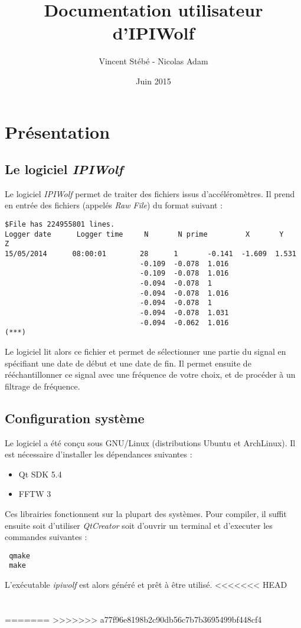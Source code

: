 \documentclass[a4paper,12pt]{article}
\begin{document}
\title{Documentation utilisateur d'IPIWolf}
\author{Vincent Stébé - Nicolas Adam}
\date{Juin 2015}

\maketitle

\newpage 
{}

\tableofcontents
\vspace{1cm}
\restoregeometry
\newpage

\section{Présentation}
\subsection{Le logiciel \emph{IPIWolf}}
Le logiciel \emph{IPIWolf} permet de traiter des fichiers issus d'accéléromètres.
Il prend en entrée des fichiers (appelés \emph{Raw File}) du format suivant :
\begin{verbatim}
$File has 224955801 lines.                                                                                                                            
Logger date      Logger time     N       N prime         X       Y       Z 
15/05/2014      08:00:01        28      1       -0.141  -1.609  1.531
                                -0.109  -0.078  1.016
                                -0.109  -0.078  1.016
                                -0.094  -0.078  1
                                -0.094  -0.078  1.016
                                -0.094  -0.078  1
                                -0.094  -0.078  1.031
                                -0.094  -0.062  1.016
(***)
\end{verbatim}
Le logiciel lit alors ce fichier et permet de sélectionner une partie du signal en spécifiant une date de début et une date de fin.
Il permet ensuite de rééchantillonner ce signal avec une fréquence de votre choix, et de procéder à un filtrage de fréquence.

\subsection{Configuration système}
Le logiciel a été conçu sous GNU/Linux (distributions Ubuntu et ArchLinux).
Il est nécessaire d'installer les dépendances suivantes :
\begin{itemize}
 \item Qt SDK 5.4
 \item FFTW 3
\end{itemize}
Ces librairies fonctionnent sur la plupart des systèmes.
Pour compiler, il suffit ensuite soit d'utiliser \emph{QtCreator} soit d'ouvrir un terminal et d'executer les commandes suivantes :
\begin{verbatim}
 qmake
 make
\end{verbatim}
L'exécutable \emph{ipiwolf} est alors généré et prêt à être utilisé.
<<<<<<< HEAD



\section{}
=======
>>>>>>> a77f96e8198b2c90db56c7b7b3695499bf448cf4
\end{document}
